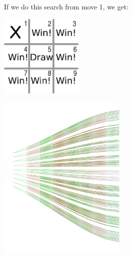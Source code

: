 \documentclass{beamer} %
\begin{document}
  
  


  \begin{frame}
    If we do this search from move 1, we get:
  \begin{center}
\includegraphics[width=0.3\textwidth]{assets/oxo-board18.pdf}
\end{center}
\end{frame}

  \begin{frame}
  \begin{center}
\includegraphics[height=80mm]{assets/oxo-full-tree-color.pdf}
\end{center}
\end{frame}
\end{document}
